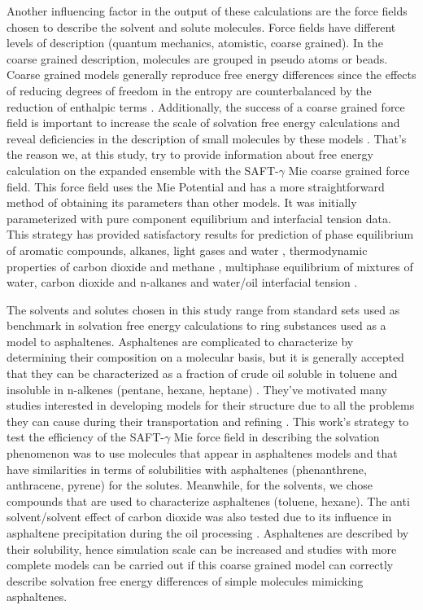 Another influencing factor in the output of these calculations are the force fields chosen to describe the solvent and solute molecules. Force fields have different levels of description (quantum mechanics, atomistic, coarse grained). In the coarse grained description, molecules are grouped in pseudo atoms or beads. Coarse grained models generally reproduce free energy differences since the effects of reducing degrees of freedom in the entropy are counterbalanced by the reduction of enthalpic terms \cite{kmiecik2016}. Additionally, the success of a coarse grained force field is important to increase the scale of solvation free energy calculations and reveal deficiencies in the description of small molecules by these models \cite{mobley2007,shirts2013}. That's the reason we, at this study, try to provide information about free energy calculation on the expanded ensemble with the SAFT-$\gamma$ Mie coarse grained force field. This force field uses the Mie Potential \cite{MIE} and has a more straightforward method of obtaining its parameters than other models. It was initially parameterized with pure component equilibrium and interfacial tension data. This strategy has provided satisfactory results for prediction of phase equilibrium of aromatic compounds, alkanes, light gases and water \cite{herdes2015,muller2017,lobanova2015} , thermodynamic properties of carbon dioxide and methane \cite{cassiano1}, multiphase equilibrium of mixtures of water, carbon dioxide and n-alkanes \cite{lobanova2016} and water/oil interfacial tension \cite{herdes2017}. 

The solvents and solutes chosen in this study range from standard sets used as benchmark in solvation free energy calculations to ring substances used as a model to asphaltenes. Asphaltenes are complicated to characterize by determining their composition on a molecular basis, but it is generally accepted that they can be characterized as a fraction of crude oil soluble in toluene and insoluble in n-alkenes (pentane, hexane, heptane) \cite{SJOBLOM2003399}. They've motivated many studies interested in developing models for their structure due to all the problems they can cause during their transportation and refining \cite{SJOBLOM20151}. This work’s strategy to test the efficiency of the SAFT-$\gamma$ Mie force field in describing the solvation phenomenon was to use molecules that appear in asphaltenes models and that have similarities in terms of solubilities with asphaltenes (phenanthrene, anthracene, pyrene) for the solutes. Meanwhile, for the solvents, we chose compounds that are used to characterize asphaltenes (toluene, hexane). The anti solvent/solvent effect of carbon dioxide was also tested due to its influence in asphaltene precipitation during the oil processing \cite{SOROUSH2014405}. Asphaltenes are described by their solubility, hence simulation scale can be increased and studies with more complete models can be carried out if this coarse grained model can correctly describe solvation free energy differences of simple molecules mimicking asphaltenes.

